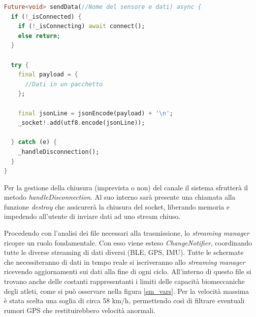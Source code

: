 \documentclass[target=bach,aauheader=,style=]{thud}
\begin{document}
\begin{lstlisting}[language=dart, caption={Gestione della trasmissione ad alta frequenza.}, label={tcp_send}]
Future<void> sendData(//Nome del sensore e dati) async {
  if (!_isConnected) {
    if (!_isConnecting) await connect();
    else return; 
  }

  try {
    final payload = {
      //Dati in un pacchetto
    };

    final jsonLine = jsonEncode(payload) + '\n';
    _socket!.add(utf8.encode(jsonLine));
    
  } catch (e) {
    _handleDisconnection();
  }
}
\end{lstlisting}
Per la gestione della chiusura (imprevista o non) del canale il sistema sfrutterà il metodo \textit{handleDisconnection}. Al suo interno sarà presente una chiamata alla funzione \textit{destroy} che assicurerà la chiusura del socket, liberando memoria e impedendo all'utente di inviare dati ad uno stream chiuso.

Procedendo con l'analisi dei file necessari alla trasmissione, lo \textit{streaming manager} ricopre un ruolo fondamentale. Con esso viene esteso \textit{ChangeNotifier}, coordinando tutte le diverse streaming di dati diversi (BLE, GPS, IMU). Tutte le schermate che necessiteranno di dati in tempo reale si iscriveranno allo \textit{streaming manager} ricevendo aggiornamenti sui dati alla fine di ogni ciclo. All'interno di questo file si trovano anche delle costanti rappresentanti i limiti delle capacità biomeccaniche degli atleti, come si può osservare nella figura \ref{sm_vars}. Per la velocità massima è stata scelta una soglia di circa 58 km/h, permettendo così di filtrare eventuali rumori GPS che restituirebbero velocità anormali.
\end{document}

